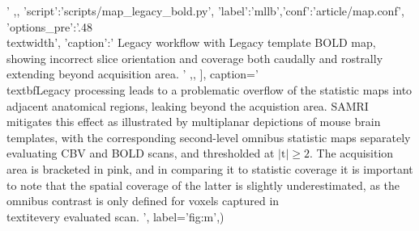 {{                                '
			,},
		{'script':'scripts/map_legacy_bold.py', 'label':'mllb','conf':'article/map.conf', 'options_pre':'{.48\\textwidth}',
			'caption':'
				Legacy workflow with Legacy template BOLD map, showing incorrect slice orientation and coverage both caudally and rostrally extending beyond acquisition area.
			        '
                        ,},
		],
	caption='
                \\textbf{Legacy processing leads to a problematic overflow of the statistic maps into adjacent anatomical regions, leaking beyond the acquistion area.}
                SAMRI mitigates this effect as illustrated by multiplanar depictions of mouse brain templates, with the corresponding second-level omnibus statistic maps separately evaluating CBV and BOLD scans, and thresholded at $\mathrm{|t|\geq2}$.
                The acquisition area is bracketed in pink, and in comparing it to statistic coverage it is important to note that the spatial coverage of the latter is slightly underestimated, as the omnibus contrast is only defined for voxels captured in \\textit{every} evaluated scan.
                ',
	label='fig:m',)}
